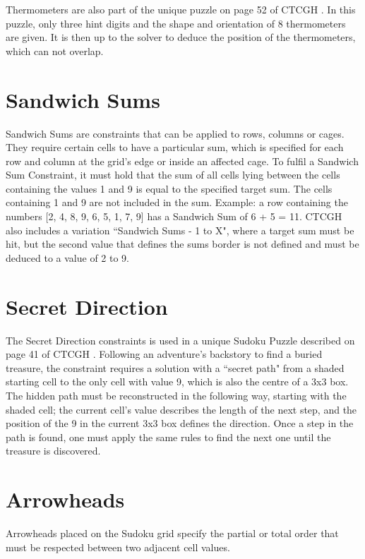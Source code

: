 Thermometers are also part of the unique puzzle on page 52 of CTCGH \cite{CrackingTheCryptic2021}. In this puzzle, only three hint digits and the shape and orientation of 8 thermometers are given. It is then up to the solver to deduce the position of the thermometers, which can not overlap.

\section{Sandwich Sums}
Sandwich Sums are constraints that can be applied to rows, columns or cages. They require certain cells to have a particular sum, which is specified for each row and column at the grid's edge or inside an affected cage. To fulfil a Sandwich Sum Constraint, it must hold that the sum of all cells lying between the cells containing the values 1 and 9 is equal to the specified target sum. The cells containing 1 and 9 are not included in the sum. Example: a row containing the numbers [2, 4, 8, 9, 6, 5, 1, 7, 9] has a Sandwich Sum of 6 + 5 = 11. CTCGH \cite{CrackingTheCryptic2021} also includes a variation ``Sandwich Sums - 1 to X", where a target sum must be hit, but the second value that defines the sums border is not defined and must be deduced to a value of 2 to 9.

\section{Secret Direction}
The Secret Direction constraints is used in a unique Sudoku Puzzle described on page 41 of CTCGH \cite{CrackingTheCryptic2021}. Following an adventure's backstory to find a buried treasure, the constraint requires a solution with a ``secret path" from a shaded starting cell to the only cell with value 9, which is also the centre of a 3x3 box. The hidden path must be reconstructed in the following way, starting with the shaded cell; the current cell's value describes the length of the next step, and the position of the 9 in the current 3x3 box defines the direction. Once a step in the path is found, one must apply the same rules to find the next one until the treasure is discovered.

\section{Arrowheads}
Arrowheads placed on the Sudoku grid specify the partial or total order that must be respected between two adjacent cell values.

